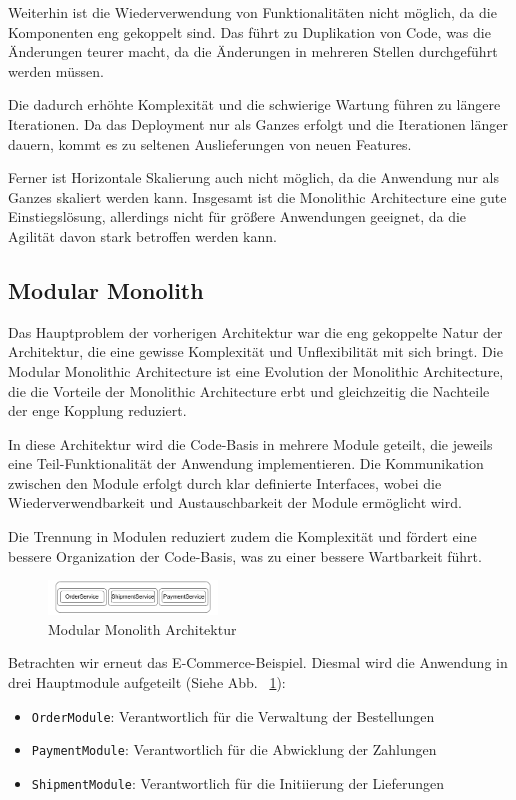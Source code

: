 \documentclass[acmtog]{acmart}
\begin{document}
Weiterhin ist die Wiederverwendung von Funktionalitäten nicht möglich, da die
Komponenten eng gekoppelt sind.
Das führt zu Duplikation von Code, was
die Änderungen teurer macht, da die Änderungen in mehreren Stellen durchgeführt werden müssen.

Die dadurch erhöhte Komplexität und die schwierige Wartung führen zu längere Iterationen.
Da das Deployment nur als Ganzes erfolgt und die Iterationen länger dauern,
kommt es zu seltenen Auslieferungen von neuen Features.

Ferner ist Horizontale Skalierung auch nicht möglich, da die Anwendung nur als Ganzes
skaliert werden kann.
Insgesamt ist die Monolithic Architecture eine gute Einstiegslösung, allerdings nicht für größere Anwendungen geeignet, da
 die Agilität davon stark betroffen werden kann.

\subsection{Modular Monolith}
Das Hauptproblem der vorherigen Architektur war die eng gekoppelte Natur der Architektur,
die eine gewisse Komplexität und Unflexibilität mit sich bringt.
Die Modular Monolithic Architecture ist eine Evolution der Monolithic Architecture, die die Vorteile
der Monolithic Architecture erbt und gleichzeitig die Nachteile der enge Kopplung reduziert.

In diese Architektur wird die Code-Basis in mehrere Module geteilt, die jeweils
eine Teil-Funktionalität der Anwendung implementieren.
Die Kommunikation zwischen den Module erfolgt durch klar definierte Interfaces,
wobei die Wiederverwendbarkeit und Austauschbarkeit der Module ermöglicht wird.\cite[11]{modular-mono2}

Die Trennung in Modulen reduziert zudem die Komplexität und fördert eine bessere
 Organization der Code-Basis, was zu einer bessere Wartbarkeit führt.\cite[23 - 24]{modular-mono4}

\begin{figure}[h!]
    \centering
    \includegraphics[width=0.4\textwidth]{images/mono/mono-example.pdf}
    \caption{Modular Monolith Architektur}
    \label{fig:modular-mono}
\end{figure}

Betrachten wir erneut das E-Commerce-Beispiel.
Diesmal wird die Anwendung in drei Hauptmodule aufgeteilt (Siehe Abb. ~\ref{fig:modular-mono}):
\begin{itemize}
    \item \texttt{OrderModule}: Verantwortlich für die Verwaltung der Bestellungen
    \item \texttt{PaymentModule}: Verantwortlich für die Abwicklung der Zahlungen
    \item \texttt{ShipmentModule}: Verantwortlich für die Initiierung der Lieferungen
\end{itemize}
\end{document}
